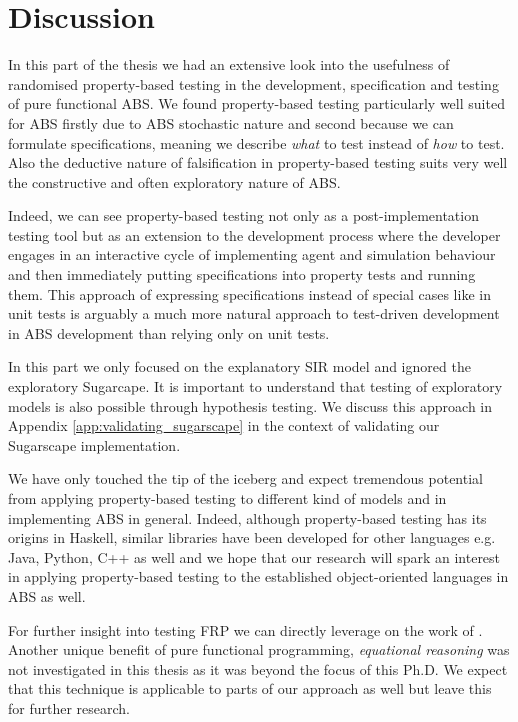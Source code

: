 \chapter*{Discussion}
In this part of the thesis we had an extensive look into the usefulness of randomised property-based testing in the development, specification and testing of pure functional ABS. We found property-based testing particularly well suited for ABS firstly due to ABS stochastic nature and second because we can formulate specifications, meaning we describe \textit{what} to test instead of \textit{how} to test. Also the deductive nature of falsification in property-based testing suits very well the constructive and often exploratory nature of ABS. 

Indeed, we can see property-based testing not only as a post-implementation testing tool but as an extension to the development process where the developer engages in an interactive cycle of implementing agent and simulation behaviour and then immediately putting specifications into property tests and running them. This approach of expressing specifications instead of special cases like in unit tests is arguably a much more natural approach to test-driven development in ABS development than relying only on unit tests.

In this part we only focused on the explanatory SIR model and ignored the exploratory Sugarcape. It is important to understand that testing of exploratory models is also possible through hypothesis testing. We discuss this approach in Appendix \ref{app:validating_sugarscape} in the context of validating our Sugarscape implementation.

We have only touched the tip of the iceberg and expect tremendous potential from applying property-based testing to different kind of models and in implementing ABS in general. Indeed, although property-based testing has its origins in Haskell, similar libraries have been developed for other languages e.g. Java, Python, C++ as well and we hope that our research will spark an interest in applying property-based testing to the established object-oriented languages in ABS as well.

For further insight into testing FRP we can directly leverage on the work of \cite{perez_testing_2017}. Another unique benefit of pure functional programming, \textit{equational reasoning} was not investigated in this thesis as it was beyond the focus of this Ph.D. We expect that this technique is applicable to parts of our approach as well but leave this for further research.